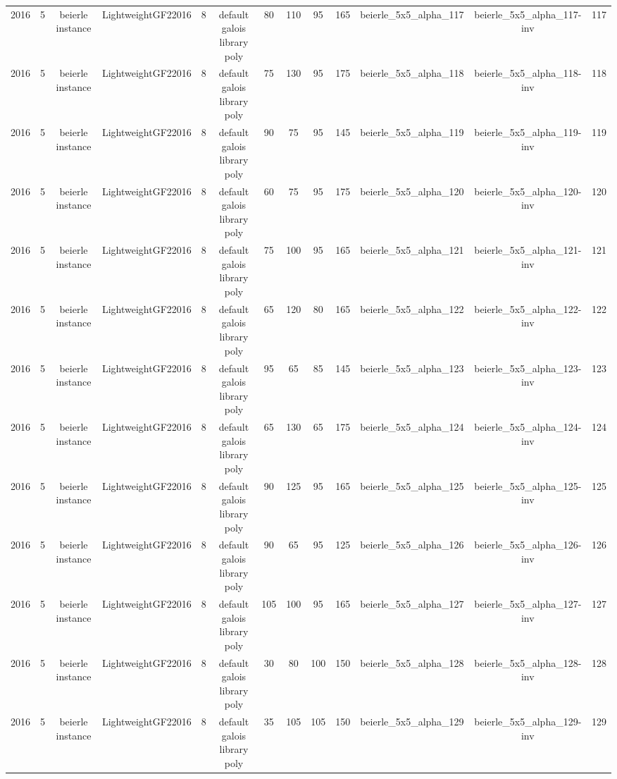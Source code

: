\begin{tabular}{c c c c c c c c c c c c c}
2016 & 5 & beierle instance & LightweightGF22016 & 8 & default galois library poly & 80 & 110 & 95 & 165 & beierle_5x5_alpha_117 & beierle_5x5_alpha_117-inv & 117 \\
2016 & 5 & beierle instance & LightweightGF22016 & 8 & default galois library poly & 75 & 130 & 95 & 175 & beierle_5x5_alpha_118 & beierle_5x5_alpha_118-inv & 118 \\
2016 & 5 & beierle instance & LightweightGF22016 & 8 & default galois library poly & 90 & 75 & 95 & 145 & beierle_5x5_alpha_119 & beierle_5x5_alpha_119-inv & 119 \\
2016 & 5 & beierle instance & LightweightGF22016 & 8 & default galois library poly & 60 & 75 & 95 & 175 & beierle_5x5_alpha_120 & beierle_5x5_alpha_120-inv & 120 \\
2016 & 5 & beierle instance & LightweightGF22016 & 8 & default galois library poly & 75 & 100 & 95 & 165 & beierle_5x5_alpha_121 & beierle_5x5_alpha_121-inv & 121 \\
2016 & 5 & beierle instance & LightweightGF22016 & 8 & default galois library poly & 65 & 120 & 80 & 165 & beierle_5x5_alpha_122 & beierle_5x5_alpha_122-inv & 122 \\
2016 & 5 & beierle instance & LightweightGF22016 & 8 & default galois library poly & 95 & 65 & 85 & 145 & beierle_5x5_alpha_123 & beierle_5x5_alpha_123-inv & 123 \\
2016 & 5 & beierle instance & LightweightGF22016 & 8 & default galois library poly & 65 & 130 & 65 & 175 & beierle_5x5_alpha_124 & beierle_5x5_alpha_124-inv & 124 \\
2016 & 5 & beierle instance & LightweightGF22016 & 8 & default galois library poly & 90 & 125 & 95 & 165 & beierle_5x5_alpha_125 & beierle_5x5_alpha_125-inv & 125 \\
2016 & 5 & beierle instance & LightweightGF22016 & 8 & default galois library poly & 90 & 65 & 95 & 125 & beierle_5x5_alpha_126 & beierle_5x5_alpha_126-inv & 126 \\
2016 & 5 & beierle instance & LightweightGF22016 & 8 & default galois library poly & 105 & 100 & 95 & 165 & beierle_5x5_alpha_127 & beierle_5x5_alpha_127-inv & 127 \\
2016 & 5 & beierle instance & LightweightGF22016 & 8 & default galois library poly & 30 & 80 & 100 & 150 & beierle_5x5_alpha_128 & beierle_5x5_alpha_128-inv & 128 \\
2016 & 5 & beierle instance & LightweightGF22016 & 8 & default galois library poly & 35 & 105 & 105 & 150 & beierle_5x5_alpha_129 & beierle_5x5_alpha_129-inv & 129 \\

\end{tabular}
